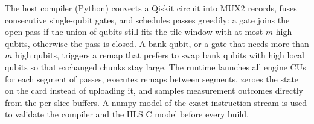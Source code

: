 The host compiler (Python) converts a Qiskit circuit into MUX2 records, fuses consecutive single-qubit gates, and schedules passes greedily: a gate joins the open pass if the union of qubits still fits the tile window with at most $m$ high qubits, otherwise the pass is closed. A bank qubit, or a gate that needs more than $m$ high qubits, triggers a remap that prefers to swap bank qubits with high local qubits so that exchanged chunks stay large. The runtime launches all engine CUs for each segment of passes, executes remaps between segments, zeroes the state on the card instead of uploading it, and samples measurement outcomes directly from the per-slice buffers. A numpy model of the exact instruction stream is used to validate the compiler and the HLS C model before every build.

\begin{table}
\centering
\caption{Implemented builds (post-route). All engines are the same HLS source; builds differ in the number of engine CUs, PCs per engine, AXI width and the maximum number of high qubits per pass.}\label{tab:builds}
\footnotesize\setlength{\tabcolsep}{3pt}

\end{table}
